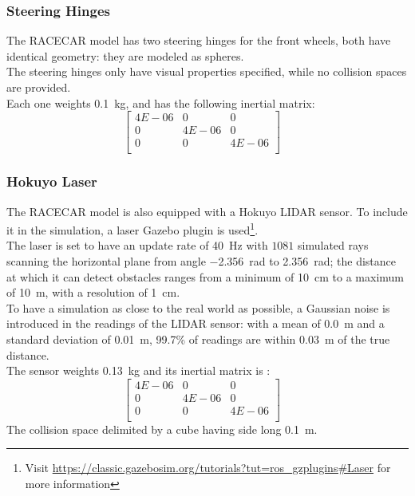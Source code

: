 \subsubsection{Steering Hinges}
The RACECAR model has two steering hinges for the front wheels, both have identical geometry: they are modeled as spheres. \\
The steering hinges only have visual properties specified, while no collision spaces are provided. \\
Each one weights \SI{0.1}{\kilogram}, and has the following inertial matrix:
$$
\begin{bmatrix}
4E-06 & 0 & 0 \\
0 & 4E-06 & 0 \\
0 & 0 & 4E-06 \\
\end{bmatrix}
\quad
$$

\subsubsection{Hokuyo Laser}
The RACECAR model is also equipped with a Hokuyo LIDAR sensor. To include it in the simulation, a laser Gazebo plugin is used\footnote{Visit 
\url{https://classic.gazebosim.org/tutorials?tut=ros_gzplugins\#Laser} for more information}. \\
The laser is set to have an update rate of \SI{40}{\hertz} with $1081$ simulated rays scanning the horizontal plane from angle \SI{-2.356}{\radian}
to \SI{2.356}{\radian}; the distance at which it can detect obstacles ranges from a minimum of \SI{10}{\cm} to a maximum of 
\SI{10}{\metre}, with a resolution of \SI{1}{\cm}.\\
To have a simulation as close to the real world as possible, a Gaussian noise is introduced in the readings of the LIDAR sensor: with a mean 
of \SI{0.0}{\metre} and a standard deviation of \SI{0.01}{\metre}, 99.7\% of readings are within \SI{0.03}{\metre} of the true distance. \\ 
The sensor weights \SI{0.13}{\kilogram} and its inertial matrix is :
$$
\begin{bmatrix}
4E-06 & 0 & 0 \\
0 & 4E-06 & 0 \\
0 & 0 & 4E-06 \\
\end{bmatrix}
\quad
$$
The collision space delimited by a cube having side long \SI{0.1}{\metre}.

